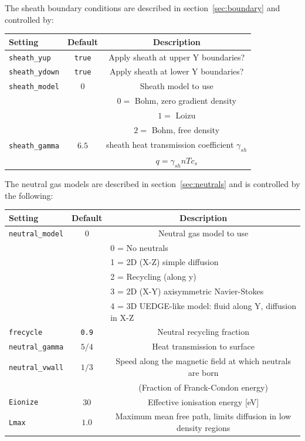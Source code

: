 \documentclass[12pt,a4paper]{article}
\begin{document}
The sheath boundary conditions are described in section~\ref{sec:boundary} and controlled by:
\begin{center}
\begin{tabular}{l c c}
  Setting & Default & Description \\
  \hline
  \texttt{sheath\_yup} & \texttt{true} & Apply sheath at upper Y boundaries? \\
  \texttt{sheath\_ydown} & \texttt{true} & Apply sheath at lower Y boundaries? \\
  \texttt{sheath\_model} & $0$ & Sheath model to use \\
  &     & $0 = $ Bohm, zero gradient density \\
  &     & $1 = $ Loizu \\
  &     & $2 = $ Bohm, free density \\
  \texttt{sheath\_gamma} & $6.5$ & sheath heat transmission coefficient $\gamma_{sh}$\\
  & & $q = \gamma_{sh}nTc_s$ \\
  \hline
\end{tabular}
\end{center}

The neutral gas models are described in section~\ref{sec:neutrals} and is controlled by the following:
\begin{center}
\begin{tabular}{l c c}
  Setting & Default & Description \\
  \hline
  \texttt{neutral\_model} & $0$ & Neutral gas model to use \\
  & & \multicolumn{1}{l|}{0 = No neutrals} \\
  & & \multicolumn{1}{l|}{1 = 2D (X-Z) simple diffusion} \\
  & & \multicolumn{1}{l|}{2 = Recycling (along y)} \\
  & & \multicolumn{1}{l|}{3 = 2D (X-Y) axisymmetric Navier-Stokes} \\
  & & \multicolumn{1}{l|}{4 = 3D UEDGE-like model: fluid along Y, diffusion in X-Z} \\
  \texttt{frecycle} & \texttt{0.9} & Neutral recycling fraction \\
  \texttt{neutral\_gamma} & $5/4$ & Heat transmission to surface \\
  \texttt{neutral\_vwall} & $1/3$ & Speed along the magnetic field at which neutrals are born \\
  & & (Fraction of Franck-Condon energy) \\
  \texttt{Eionize} & $30$ & Effective ionisation energy [eV] \\
  \texttt{Lmax} & $1.0$ & Maximum mean free path, limits diffusion in low density regions \\
  \hline
\end{tabular}
\end{center}
\end{document}

